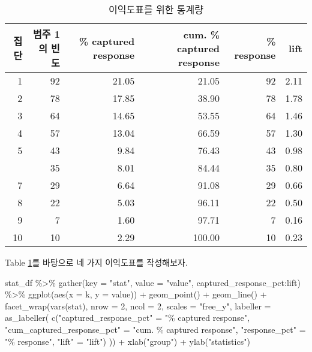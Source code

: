 \documentclass[
]{book}
\newenvironment{Shaded}{\begin{snugshade}}{\end{snugshade}}
\newcommand{\AttributeTok}[1]{\textcolor[rgb]{0.77,0.63,0.00}{#1}}
\newcommand{\DecValTok}[1]{\textcolor[rgb]{0.00,0.00,0.81}{#1}}
\newcommand{\FunctionTok}[1]{\textcolor[rgb]{0.00,0.00,0.00}{#1}}
\newcommand{\NormalTok}[1]{#1}
\newcommand{\OtherTok}[1]{\textcolor[rgb]{0.56,0.35,0.01}{#1}}
\newcommand{\SpecialCharTok}[1]{\textcolor[rgb]{0.00,0.00,0.00}{#1}}
\newcommand{\StringTok}[1]{\textcolor[rgb]{0.31,0.60,0.02}{#1}}
\begin{document}
\begin{table}

\caption{\label{tab:gain-chart-stat}이익도표를 위한 통계량}
\centering
\begin{tabular}[t]{rrrrrr}
\toprule
집단 & 범주 1의 빈도 & \% captured response & cum. \% captured response & \% response & lift\\
\midrule
1 & 92 & 21.05 & 21.05 & 92 & 2.11\\
2 & 78 & 17.85 & 38.90 & 78 & 1.78\\
3 & 64 & 14.65 & 53.55 & 64 & 1.46\\
4 & 57 & 13.04 & 66.59 & 57 & 1.30\\
5 & 43 & 9.84 & 76.43 & 43 & 0.98\\
\addlinespace
6 & 35 & 8.01 & 84.44 & 35 & 0.80\\
7 & 29 & 6.64 & 91.08 & 29 & 0.66\\
8 & 22 & 5.03 & 96.11 & 22 & 0.50\\
9 & 7 & 1.60 & 97.71 & 7 & 0.16\\
10 & 10 & 2.29 & 100.00 & 10 & 0.23\\
\bottomrule
\end{tabular}
\end{table}

Table \ref{tab:gain-chart-stat}를 바탕으로 네 가지 이익도표를 작성해보자.

\begin{Shaded}
\begin{Highlighting}[]
\NormalTok{stat\_df }\SpecialCharTok{\%\textgreater{}\%}
  \FunctionTok{gather}\NormalTok{(}\AttributeTok{key =} \StringTok{"stat"}\NormalTok{, }\AttributeTok{value =} \StringTok{"value"}\NormalTok{,}
\NormalTok{         captured\_response\_pct}\SpecialCharTok{:}\NormalTok{lift) }\SpecialCharTok{\%\textgreater{}\%}
  \FunctionTok{ggplot}\NormalTok{(}\FunctionTok{aes}\NormalTok{(}\AttributeTok{x =}\NormalTok{ k, }\AttributeTok{y =}\NormalTok{ value)) }\SpecialCharTok{+}
  \FunctionTok{geom\_point}\NormalTok{() }\SpecialCharTok{+}
  \FunctionTok{geom\_line}\NormalTok{() }\SpecialCharTok{+}
  \FunctionTok{facet\_wrap}\NormalTok{(}\FunctionTok{vars}\NormalTok{(stat), }\AttributeTok{nrow =} \DecValTok{2}\NormalTok{, }\AttributeTok{ncol =} \DecValTok{2}\NormalTok{, }\AttributeTok{scales =} \StringTok{"free\_y"}\NormalTok{,}
             \AttributeTok{labeller =} \FunctionTok{as\_labeller}\NormalTok{(}
               \FunctionTok{c}\NormalTok{(}\StringTok{"captured\_response\_pct"} \OtherTok{=} \StringTok{"\% captured response"}\NormalTok{,}
                 \StringTok{"cum\_captured\_response\_pct"} \OtherTok{=} \StringTok{"cum. \% captured response"}\NormalTok{,}
                 \StringTok{"response\_pct"} \OtherTok{=} \StringTok{"\% response"}\NormalTok{,}
                 \StringTok{"lift"} \OtherTok{=} \StringTok{"lift"}\NormalTok{)}
\NormalTok{             )) }\SpecialCharTok{+}
  \FunctionTok{xlab}\NormalTok{(}\StringTok{"group"}\NormalTok{) }\SpecialCharTok{+}
  \FunctionTok{ylab}\NormalTok{(}\StringTok{"statistics"}\NormalTok{)}
\end{Highlighting}
\end{Shaded}
\end{document}
